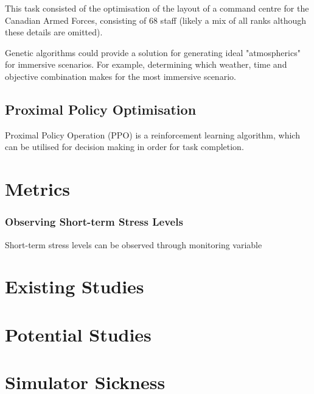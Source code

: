 \documentclass{article}
\begin{document}
This task consisted of the optimisation of the layout of a command centre for the Canadian Armed Forces, consisting of 68 staff (likely a mix of all ranks although these details are omitted).

Genetic algorithms could provide a solution for generating ideal "atmospherics" for immersive scenarios. For example, determining which weather, time and objective combination makes for the most immersive scenario.  

\subsection{Proximal Policy Optimisation}

Proximal Policy Operation (PPO) is a reinforcement learning algorithm, which can be utilised for decision making in order for task completion. \cite{schulman2017proximal}

\section{Metrics}

\subsubsection{Observing Short-term Stress Levels}

Short-term stress levels can be observed through monitoring variable 

\section{Existing Studies}


\section{Potential Studies}



\section{Simulator Sickness}



{}
\end{document}
